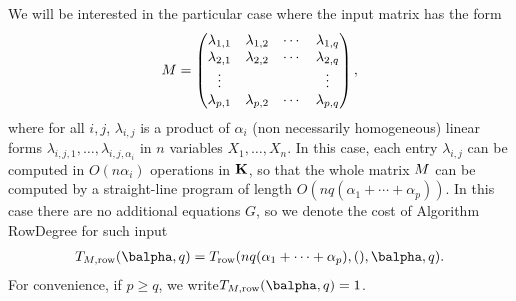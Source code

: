 \documentclass[12pt]{article}
\begin{document}
We will be interested in the particular case where the input matrix
has the form
\begin{align}\label{eqdef:type2aff}
  {M}= \left( \begin{matrix}
    \lambda_{1,1} & \lambda_{1,2} & \cdots & \lambda_{1, q}\\
    \lambda_{2,1} &  \lambda_{2,2} & \cdots & \lambda_{2, q}\\
    \vdots & & & \vdots\\
    \lambda_{p,1} &  \lambda_{p,2}& \cdots & \lambda_{p, q}
  \end{matrix} \right),
\end{align}
where for all $i,j$, $\lambda_{i,j}$ is a product of $\alpha_i$ (non
necessarily homogeneous) linear forms
$\lambda_{i,j,1},\dots,\lambda_{i,j,\alpha_i}$ in $n$ variables
$X_1,\dots,X_n$. In this case, each entry $\lambda_{i,j}$ can be
computed in $O(n \alpha_i)$ operations in $\mathbf{K}$, so that the whole
matrix ${M}$ can be computed by a straight-line program of length
$O(nq(\alpha_1+\cdots+\alpha_p))$. In this case there are no
additional equations $G$, so we denote the cost of Algorithm {\sf
  RowDegree} for such input 
\begin{align}
T_{M,{\rm row}}(\balpha,q)=T_{\rm row}(nq(\alpha_1+\cdots+\alpha_p),(),\balpha,q).
\end{align}
For convenience, if $p \ge q$,
we write$T_{M,{\rm row}}(\balpha,q)=1$.
\end{document}

